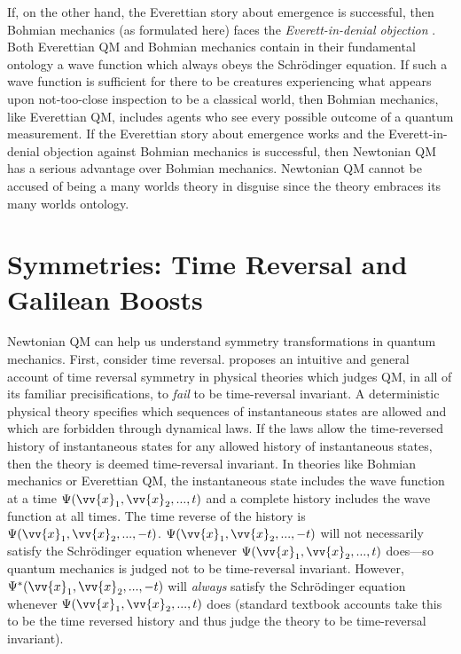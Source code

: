 \documentclass[onecolumn,secnumarabic,balancelastpage,amsmath,amssymb,nofootinbib]{article}
\begin{document}
If, on the other hand, the Everettian story about emergence is successful, then Bohmian mechanics (as formulated here) faces the \emph{Everett-in-denial objection} \citep{deutsch1996lockwood,brown2005,valentini2010}.  Both Everettian QM and Bohmian mechanics contain in their fundamental ontology a wave function which always obeys the Schr\"{o}dinger equation.  If such a wave function is sufficient for there to be creatures experiencing what appears upon not-too-close inspection to be a classical world, then Bohmian mechanics, like Everettian QM, includes agents who see every possible outcome of a quantum measurement.  If the Everettian story about emergence works and the Everett-in-denial objection against Bohmian mechanics is successful, then Newtonian QM has a serious advantage over Bohmian mechanics.  Newtonian QM cannot be accused of being a many worlds theory in disguise since the theory embraces its many worlds ontology.

\section{Symmetries: Time Reversal and Galilean Boosts}\label{sym}

Newtonian QM can help us understand symmetry transformations in quantum mechanics.  First, consider time reversal.  \citet{albert2000} proposes an intuitive and general account of time reversal symmetry in physical theories which judges QM, in all of its familiar precisifications, to \emph{fail} to be time-reversal invariant.  A deterministic physical theory specifies which sequences of instantaneous states are allowed and which are forbidden through dynamical laws.  If the laws allow the time-reversed history of instantaneous states for any allowed history of instantaneous states, then the theory is deemed time-reversal invariant.  In theories like Bohmian mechanics or Everettian QM, the instantaneous state includes the wave function at a time $\Psi(\vv{x}_1,\vv{x}_2,...,t)$ and a complete history includes the wave function at all times.  The time reverse of the history is $\Psi(\vv{x}_1,\vv{x}_2,...,-t)$.  $\Psi(\vv{x}_1,\vv{x}_2,...,-t)$ will not necessarily satisfy the Schr\"{o}dinger equation whenever $\Psi(\vv{x}_1,\vv{x}_2,...,t)$ does---so quantum mechanics is judged not to be time-reversal invariant.  However, $\Psi^*(\vv{x}_1,\vv{x}_2,...,-t)$ will \emph{always} satisfy the Schr\"{o}dinger equation whenever $\Psi(\vv{x}_1,\vv{x}_2,...,t)$ does (standard textbook accounts take this to be the time reversed history and thus judge the theory to be time-reversal invariant).
\end{document}
